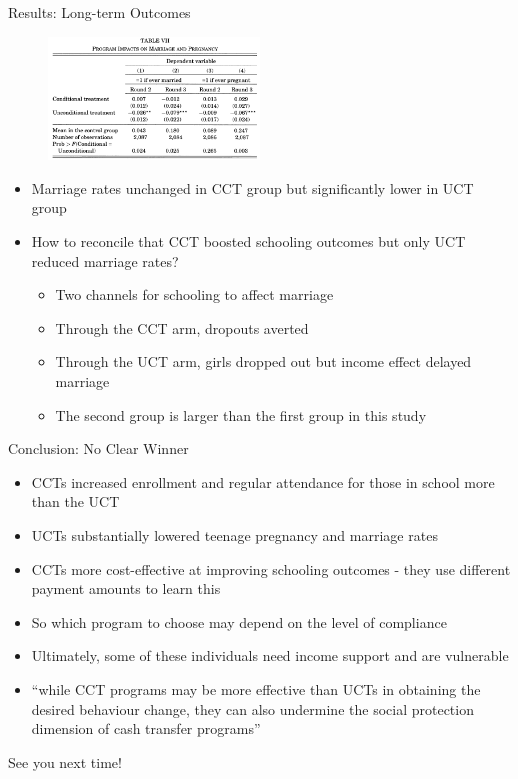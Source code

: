 \documentclass[11pt,notes=hide,aspectratio=169,mathserif]{beamer}
\begin{document}
\begin{frame}{Results: Long-term Outcomes}
\begin{figure}
\centering
\includegraphics[width=0.5\textwidth]{inputs/table10.png}
\end{figure}
\end{frame}
\begin{frame}
\begin{itemize}
    \item Marriage rates unchanged in CCT group but significantly lower in UCT group
    \item How to reconcile that CCT boosted schooling outcomes but only UCT reduced marriage rates?
    \begin{itemize}
        \item Two channels for schooling to affect marriage 
        \item Through the CCT arm, dropouts averted 
        \item Through the UCT arm, girls dropped out but income effect delayed marriage 
        \item The second group is larger than the first group in this study 
    \end{itemize}
\end{itemize}
\end{frame}

\begin{frame}{Conclusion: No Clear Winner}
\begin{itemize}
\item CCTs increased enrollment and regular attendance for those in school more than the UCT
\item UCTs substantially lowered teenage pregnancy and marriage rates 
\item CCTs more cost-effective at improving schooling outcomes - they use different payment amounts to learn this 
\item So which program to choose may depend on the level of compliance 
\item Ultimately, some of these individuals need income support and are vulnerable
\item ``while CCT programs may be more effective than UCTs in obtaining the desired behaviour change, they can also undermine the social protection dimension of cash transfer programs''
\end{itemize}
\end{frame}

\begin{frame}
\begin{center}{\LARGE See you next time!}\end{center}
\end{frame}
\end{document}
